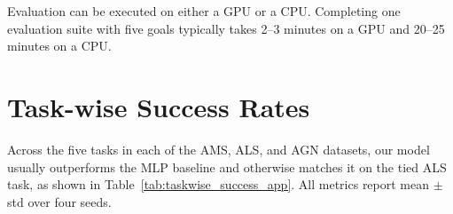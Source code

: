 \documentclass{article}
\begin{document}
Evaluation can be executed on either a GPU or a CPU. Completing one evaluation suite with five goals typically takes 2--3 minutes on a GPU and 20--25 minutes on a CPU.

\section{Task-wise Success Rates}\label{app:tasks}
Across the five tasks in each of the AMS, ALS, and AGN datasets, our model usually outperforms the MLP baseline and otherwise matches it on the tied ALS task, as shown in Table~\ref{tab:taskwise_success_app}. All metrics report mean $\pm$ std over four seeds.
\begin{table}[h]
\centering
\scriptsize
\setlength{\tabcolsep}{2.5pt}
\caption{Task-wise final evaluation success. The gains are heterogeneous across goals, motivating trajectory-level visualization rather than a claim that a single scalar critic statistic explains every task.}
\label{tab:taskwise_success_app}
\end{table}
\FloatBarrier
\end{document}
